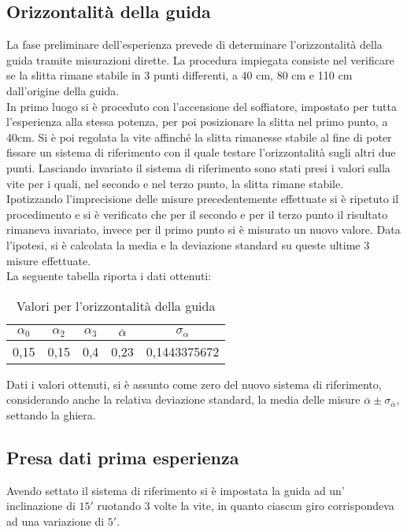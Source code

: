 \documentclass[a4paper,11pt,oneside]{article}
\begin{document}
\subsection{Orizzontalità della guida}
La fase preliminare dell'esperienza prevede di determinare l'orizzontalità della guida tramite misurazioni dirette. La procedura impiegata consiste nel verificare se la slitta rimane stabile in 3 punti differenti, a 40 cm, 80 cm e 110 cm dall'origine della guida.\\
In primo luogo si è proceduto con l'accensione del soffiatore, impostato per tutta l'esperienza alla stessa potenza, per poi posizionare la slitta nel primo punto, a 40cm. Si è poi regolata la vite affinché la slitta rimanesse stabile al fine di poter fissare un sistema di riferimento con il quale testare l'orizzontalità sugli altri due punti. Lasciando invariato il sistema di riferimento sono stati presi i valori sulla vite per i quali, nel secondo  e nel terzo punto, la slitta rimane stabile.\\
Ipotizzando l'imprecisione delle misure precedentemente effettuate si è ripetuto il procedimento e si è verificato che per il secondo e per il terzo punto il risultato rimaneva invariato, invece per il primo punto si è misurato un nuovo valore. Data l'ipotesi, si è calcolata la media e la deviazione standard su queste ultime 3 misure effettuate.\\
La seguente tabella riporta i dati ottenuti:

\begin{table}[h]
    \centering
        \caption{Valori per l'orizzontalità della guida}

\begin{tabular}{ccc|cc}

    \toprule
    $\alpha_{0}$&$\alpha_{2}$&$\alpha_{3}$&$\overline{\alpha}$&$\sigma_{\overline{\alpha}}$\\
    \midrule
0,15&0,15&0,4&0,23&0,1443375672 \\
    \bottomrule
    \end{tabular}
    \label{tab:guida_orizzontale}
\end{table}
Dati i valori ottenuti, si è assunto come zero del nuovo sistema di riferimento, considerando anche la relativa deviazione standard, la media delle misure $\overline{\alpha} \pm \sigma_{\overline{\alpha}}$, settando la ghiera.\\




\subsection{Presa dati prima esperienza}
Avendo settato il sistema di riferimento si è impostata la guida ad un' inclinazione di $15'$ ruotando 3 volte la vite, in quanto ciascun giro corrispondeva ad una variazione  di $5'$.\\
\end{document}
